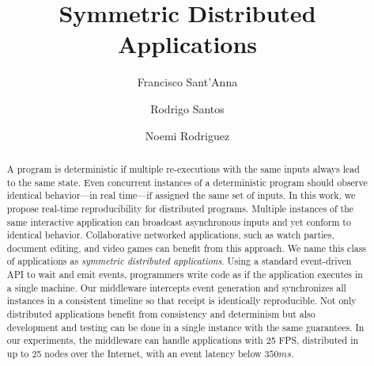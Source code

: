 \documentclass[sigplan,screen]{acmart}
\begin{document}
\title{Symmetric Distributed Applications}

\author{Francisco Sant'Anna}

\author{Rodrigo Santos}

\author{Noemi Rodriguez}


\begin{abstract}
A program is deterministic if multiple re-executions with the same inputs
always lead to the same state.
Even concurrent instances of a deterministic program should observe identical
behavior---in real time---if assigned the same set of inputs.
%
In this work, we propose real-time reproducibility for distributed programs.
Multiple instances of the same interactive application can broadcast
asynchronous inputs and yet conform to identical behavior.
Collaborative networked applications, such as watch parties, document editing,
and video games can benefit from this approach.
We name this class of applications as \emph{symmetric distributed applications}.
%
Using a standard event-driven API to wait and emit events, programmers write
code as if the application executes in a single machine.
Our middleware intercepts event generation and synchronizes all instances in a
consistent timeline so that receipt is identically reproducible.
Not only distributed applications benefit from consistency and determinism but
also development and testing can be done in a single instance with the same
guarantees.
In our experiments, the middleware can handle applications with 25 FPS,
distributed in up to 25 nodes over the Internet, with an event latency below
$350ms$.
\end{abstract}

\end{document}
